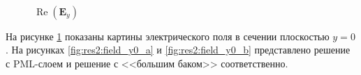 \documentclass[a4paper,12pt]{article}
\renewcommand{\Re}{\mathop{\mathrm{Re}}\nolimits}
\begin{document}
\vspace{-0.8cm}

\begin{figure}[H]
	\centering
	~~
	\caption{$\Re(\mathbf{E}_y)$}
	\label{fig:res2:field_y0}
\end{figure}

На рисунке \ref{fig:res2:field_y0} показаны картины электрического поля в сечении плоскостью $y=0$. На рисунках \ref{fig:res2:field_y0_a} и \ref{fig:res2:field_y0_b} представлено решение с PML-слоем и решение с <<большим баком>> соответственно.
\end{document}
